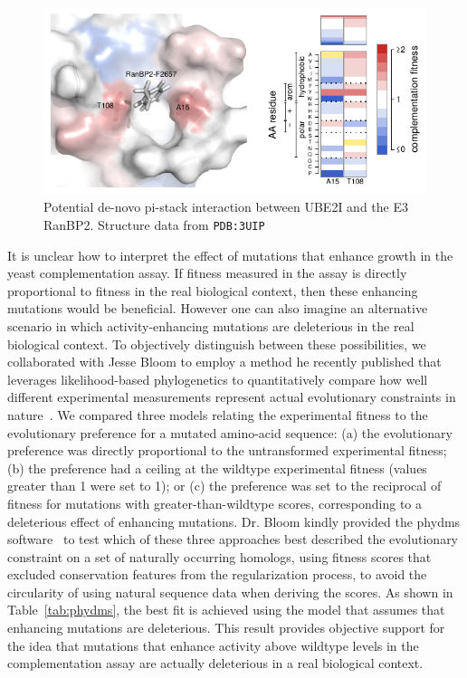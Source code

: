 \begin{figure}[h!]
	\centering
	\includegraphics[width=\textwidth]{img/pi-stack.pdf}
	\caption{Potential de-novo pi-stack interaction between UBE2I and the E3 RanBP2. Structure data from \texttt{PDB:3UIP}~\cite{gareau_determinants_2012}}
	\label{fig:pi-stack}
\end{figure}

It is unclear how to interpret the effect of mutations that enhance growth in the yeast complementation assay. If fitness measured in the assay is directly proportional to fitness in the real biological context, then these enhancing mutations would be beneficial. However one can also imagine an alternative scenario in which activity-enhancing mutations are deleterious in the real biological context. To objectively distinguish between these possibilities, we collaborated with Jesse Bloom to employ a method he recently published that leverages likelihood-based phylogenetics to quantitatively compare how well different experimental measurements represent actual evolutionary constraints in nature~\cite{bloom_experimentally_2014,bloom_identification_2017}. We compared three models relating the experimental fitness to the evolutionary preference for a mutated amino-acid sequence: (a) the evolutionary preference was directly proportional to the untransformed experimental fitness; (b) the preference had a ceiling at the wildtype experimental fitness (values greater than 1 were set to 1); or (c) the preference was set to the reciprocal of fitness for mutations with greater-than-wildtype scores, corresponding to a deleterious effect of enhancing mutations. Dr. Bloom kindly provided the phydms software~\cite{bloom_identification_2017} to test which of these three approaches best described the evolutionary constraint on a set of naturally occurring  homologs, using fitness scores that excluded conservation features from the regularization process, to avoid the circularity of using natural sequence data when deriving the scores. As shown in Table~\ref{tab:phydms}, the best fit is achieved using the model that assumes that enhancing mutations are deleterious. This result provides objective support for the idea that mutations that enhance activity above wildtype levels in the complementation assay are actually deleterious in a real biological context.

